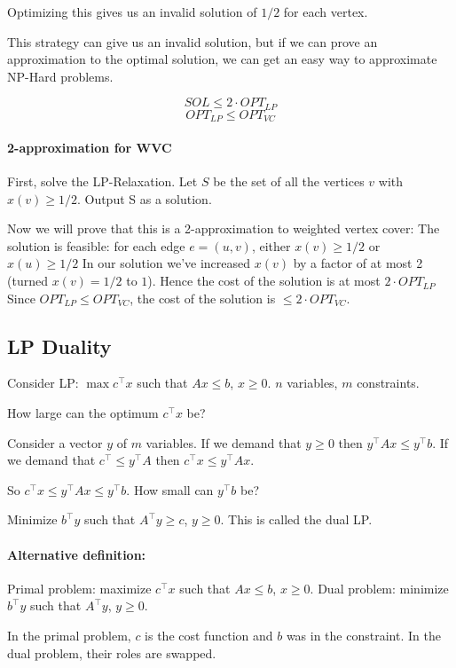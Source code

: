 \documentclass[a4paper]{article}
\begin{document}
Optimizing this gives us an invalid solution of $1/2$ for each vertex. 

This strategy can give us an invalid solution, but if we can prove an approximation to the optimal solution, we can get an easy way to approximate NP-Hard problems.

\[SOL \le 2 \cdot OPT_{LP}\]
\[OPT_{LP} \le OPT_{VC}\]


\paragraph{2-approximation for WVC}
First, solve the LP-Relaxation. Let $S$ be the set of all the vertices $v$ with $x(v) \ge 1/2$. Output S as a solution.

Now we will prove that this is a 2-approximation to weighted vertex cover:
The solution is feasible: for each edge $e=(u,v)$,
either $x(v) \ge 1/2$ or $x(u) \ge 1/2$
In our solution we've increased $x(v)$ by a factor of at most 2 (turned $x(v)=1/2$ to $1$). Hence the cost of the solution is at most $2\cdot OPT_{LP}$
Since $OPT_{LP} \le OPT_{VC}$, the cost of the solution is $\le 2 \cdot OPT_{VC}$.

\subsection{LP Duality}
Consider LP: $\max c^{\intercal}x$ such that $Ax \le b$, $x \ge 0$.
$n$ variables, $m$ constraints.

How large can the optimum $c^\intercal x$ be?

Consider a vector $y$ of $m$ variables.
If we demand that $y \ge 0$ then $y^\intercal Ax \le y^\intercal b$.
If we demand that $c^\intercal \le y^\intercal A$ then $c^\intercal x \le y^\intercal Ax$.

So $c^\intercal x \le y^\intercal Ax \le y^\intercal b$.
How small can $y^\intercal b$ be?

Minimize $b^\intercal y$ such that $A^\intercal y \ge c$, $y \ge 0$.
This is called the dual LP.

\paragraph{Alternative definition:}
Primal problem: maximize $c^\intercal x$ such that $Ax \le b$, $x \ge 0$.
Dual problem: minimize $b^\intercal y$ such that $A^\intercal y$, $y \ge 0$.

In the primal problem, $c$ is the cost function and $b$ was in the constraint. In the dual problem, their roles are swapped.
\end{document}
